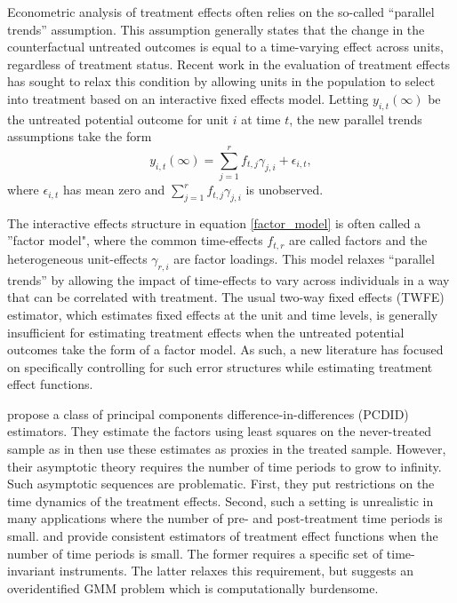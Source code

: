 \documentclass[12pt,fleqn]{article}
\begin{document}
Econometric analysis of treatment effects often relies on the so-called ``parallel trends'' assumption. This assumption generally states that the change in the counterfactual untreated outcomes is equal to a time-varying effect across units, regardless of treatment status. Recent work in the evaluation of treatment effects has sought to relax this condition by allowing units in the population to select into treatment based on an interactive fixed effects model. Letting $y_{i,t}(\infty)$ be the untreated potential outcome for unit $i$ at time $t$, the new parallel trends assumptions take the form
\begin{equation}
    y_{i,t}(\infty) = \sum_{j = 1}^r f_{t,j} \gamma_{j,i} + \epsilon_{i,t},\label{factor_model}
\end{equation}
where $\epsilon_{i,t}$ has mean zero and $\sum_{j = 1}^r f_{t,j} \gamma_{j,i}$ is unobserved.

The interactive effects structure in equation \eqref{factor_model} is often called a ''factor model", where the common time-effects $f_{t,r}$ are called factors and the heterogeneous unit-effects $\gamma_{r,i}$ are factor loadings. This model relaxes ``parallel trends'' by allowing the impact of time-effects to vary across individuals in a way that can be correlated with treatment. The usual two-way fixed effects (TWFE) estimator, which estimates fixed effects at the unit and time levels, is generally insufficient for estimating treatment effects when the untreated potential outcomes take the form of a factor model. As such, a new literature has focused on specifically controlling for such error structures while estimating treatment effect functions.

\citet{chan2022pcdid} propose a class of principal components difference-in-differences (PCDID) estimators. They estimate the factors using least squares on the never-treated sample as in \citet{bai2009panel} then use these estimates as proxies in the treated sample. However, their asymptotic theory requires the number of time periods to grow to infinity. Such asymptotic sequences are problematic. First, they put restrictions on the time dynamics of the treatment effects. Second, such a setting is unrealistic in many applications where the number of pre- and post-treatment time periods is small. \citet{Callaway_Karami_2020} and \citet{brown2022generalized} provide consistent estimators of treatment effect functions when the number of time periods is small. The former requires a specific set of time-invariant instruments. The latter relaxes this requirement, but suggests an overidentified GMM problem which is computationally burdensome.
\end{document}
